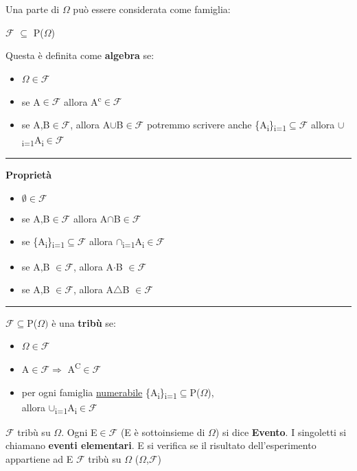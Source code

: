 \documentclass[11pt, letterpaper]{article}
\def\SPSB#1#2{\rlap{\textsuperscript{#1}}\SB{#2}}
\def\SP#1{\textsuperscript{#1}}
\def\SB#1{\textsubscript{#1}}
\def\separator{\begin{center}    \rule{100pt}{0.5pt}\end{center}}
\begin{document}
Una parte di $\Omega$ può essere considerata come famiglia:
\begin{center}
    $\mathcal{F}$ $\subseteq$ P($\Omega$)
\end{center}
Questa è definita come \textbf{algebra} se:
\begin{itemize}
    \item $\Omega\in\mathcal{F}$
    \item se A$\in\mathcal{F}$ allora A\SP{c}$\in\mathcal{F}$
    \item se A,B$\in\mathcal{F}$, allora A$\cup$B$\in\mathcal{F}$
    \subitem potremmo scrivere anche \{A\SB{i}\}\SPSB{n}{i=1}$\subseteq\mathcal{F}$ allora 
    $\cup$\SPSB{n}{i=1}A\SB{i}$\in\mathcal{F}$
\end{itemize}

\separator

\large{\textbf{Proprietà}}\normalsize
\begin{itemize}
    \item $\emptyset\in\mathcal{F}$
    \item se A,B$\in\mathcal{F}$ allora A$\cap$B$\in\mathcal{F}$
    \item se \{A\SB{i}\}\SPSB{n}{i=1}$\subseteq\mathcal{F}$ allora $\cap$\SPSB{n}{i=1}A\SB{i}$\in\mathcal{F}$
    \item se A,B $\in\mathcal{F}$, allora A$\cdot$B $\in\mathcal{F}$
    \item se A,B $\in\mathcal{F}$, allora A$\triangle$B $\in\mathcal{F}$
\end{itemize}

\separator
 
$\mathcal{F}\subseteq$P($\Omega)$ è una \textbf{tribù} se:
\begin{itemize}
    \item $\Omega\in\mathcal{F}$ 
    \item A$\in\mathcal{F}\Rightarrow$ A\SP{C}$\in\mathcal{F}$
    \item per ogni famiglia \underline{numerabile} \{A\SB{i}\}\SPSB{+$\infty$}{i=1}$\subseteq$P($\Omega$),\\ allora 
    $\cup$\SPSB{+$\infty$}{i=1}A\SB{i}$\in\mathcal{F}$
\end{itemize}

$\mathcal{F}$ tribù su $\Omega$. Ogni E$\in\mathcal{F}$ (E è sottoinsieme di $\Omega$) si dice \textbf{Evento}.
I singoletti si chiamano \textbf{eventi elementari}. E si verifica se il risultato dell'esperimento appartiene ad E
$\mathcal{F}$ tribù su $\Omega$ ($\Omega$,$\mathcal{F}$)\\
\end{document}
